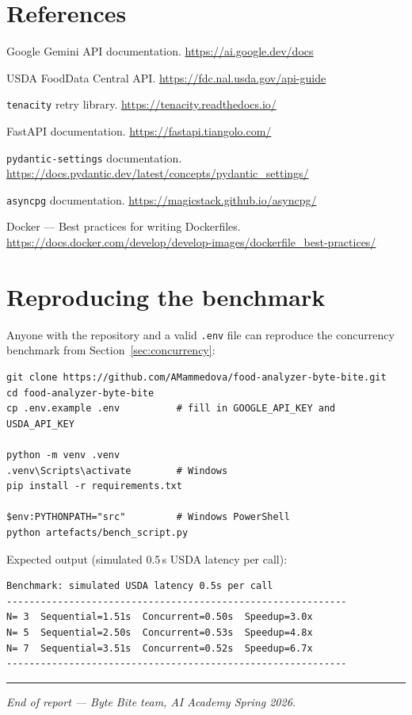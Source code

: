 \documentclass[11pt,a4paper]{article}
\begin{document}
\section*{References}

\begin{enumerate}[label={[\arabic*]},leftmargin=2.4em,itemsep=3pt]
  \item Google Gemini API documentation. \url{https://ai.google.dev/docs}
  \item USDA FoodData Central API. \url{https://fdc.nal.usda.gov/api-guide}
  \item \texttt{tenacity} retry library. \url{https://tenacity.readthedocs.io/}
  \item FastAPI documentation. \url{https://fastapi.tiangolo.com/}
  \item \texttt{pydantic-settings} documentation. \url{https://docs.pydantic.dev/latest/concepts/pydantic_settings/}
  \item \texttt{asyncpg} documentation. \url{https://magicstack.github.io/asyncpg/}
  \item Docker --- Best practices for writing Dockerfiles. \url{https://docs.docker.com/develop/develop-images/dockerfile_best-practices/}
\end{enumerate}

\appendix
\section{Reproducing the benchmark}

Anyone with the repository and a valid \texttt{.env} file can reproduce the concurrency benchmark from Section~\ref{sec:concurrency}:

\begin{lstlisting}[style=bash]
git clone https://github.com/AMammedova/food-analyzer-byte-bite.git
cd food-analyzer-byte-bite
cp .env.example .env          # fill in GOOGLE_API_KEY and USDA_API_KEY

python -m venv .venv
.venv\Scripts\activate        # Windows
pip install -r requirements.txt

$env:PYTHONPATH="src"         # Windows PowerShell
python artefacts/bench_script.py
\end{lstlisting}

Expected output (simulated 0.5\,s USDA latency per call):

\begin{lstlisting}[style=bash]
Benchmark: simulated USDA latency 0.5s per call
------------------------------------------------------------
N= 3  Sequential=1.51s  Concurrent=0.50s  Speedup=3.0x
N= 5  Sequential=2.50s  Concurrent=0.53s  Speedup=4.8x
N= 7  Sequential=3.51s  Concurrent=0.52s  Speedup=6.7x
------------------------------------------------------------
\end{lstlisting}

\vspace{1em}\hrule\vspace{0.6em}
\noindent\small\textit{End of report --- Byte Bite team, AI Academy Spring 2026.}
\end{document}
